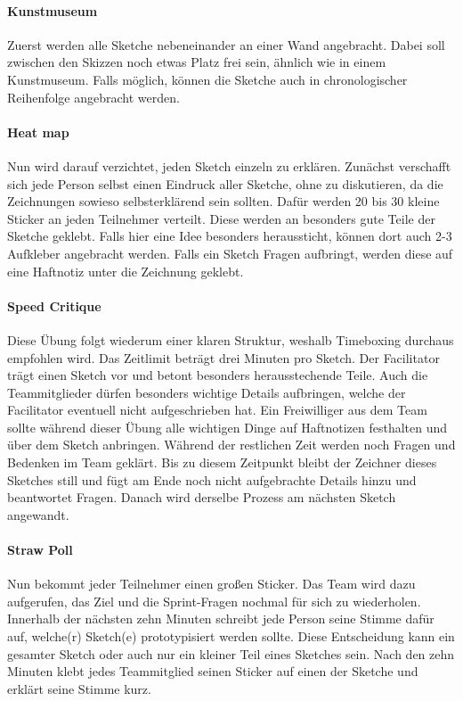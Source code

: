 \paragraph{Kunstmuseum}
Zuerst werden alle Sketche nebeneinander an einer Wand angebracht. Dabei soll zwischen den Skizzen noch etwas Platz frei sein, ähnlich wie in einem Kunstmuseum. Falls möglich, können die Sketche auch in chronologischer Reihenfolge angebracht werden.

\paragraph{Heat map}
Nun wird darauf verzichtet, jeden Sketch einzeln zu erklären. Zunächst verschafft sich jede Person selbst einen Eindruck aller Sketche, ohne zu diskutieren, da die Zeichnungen sowieso selbsterklärend sein sollten. Dafür werden 20 bis 30 kleine Sticker an jeden Teilnehmer verteilt. Diese werden an besonders gute Teile der Sketche geklebt. Falls hier eine Idee besonders heraussticht, können dort auch 2-3 Aufkleber angebracht werden. Falls ein Sketch Fragen aufbringt, werden diese auf eine Haftnotiz unter die Zeichnung geklebt.

\paragraph{Speed Critique}
Diese Übung folgt wiederum einer klaren Struktur, weshalb Timeboxing durchaus empfohlen wird. Das Zeitlimit beträgt drei Minuten pro Sketch. Der Facilitator trägt einen Sketch vor und betont besonders herausstechende Teile. Auch die Teammitglieder dürfen besonders wichtige Details aufbringen, welche der Facilitator eventuell nicht aufgeschrieben hat. Ein Freiwilliger aus dem Team sollte während dieser Übung alle wichtigen Dinge auf Haftnotizen festhalten und über dem Sketch anbringen. Während der restlichen Zeit werden noch Fragen und Bedenken im Team geklärt. Bis zu diesem Zeitpunkt bleibt der Zeichner dieses Sketches still und fügt am Ende noch nicht aufgebrachte Details hinzu und beantwortet Fragen. Danach wird derselbe Prozess am nächsten Sketch angewandt.

\paragraph{Straw Poll}
Nun bekommt jeder Teilnehmer einen großen Sticker. Das Team wird dazu aufgerufen, das Ziel und die Sprint-Fragen nochmal für sich zu wiederholen. Innerhalb der nächsten zehn Minuten schreibt jede Person seine Stimme dafür auf, welche(r) Sketch(e) prototypisiert werden sollte. Diese Entscheidung kann ein gesamter Sketch oder auch nur ein kleiner Teil eines Sketches sein. Nach den zehn Minuten klebt jedes Teammitglied seinen Sticker auf einen der Sketche und erklärt seine Stimme kurz.

